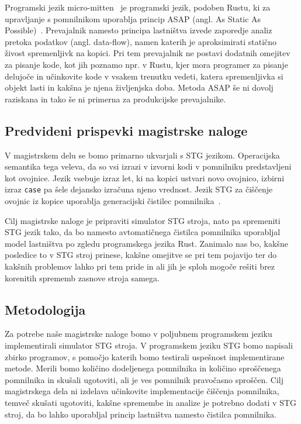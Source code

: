 \documentclass[a4paper, 12pt]{article}
\begin{document}

Programski jezik micro-mitten~\cite{corbyn:practical-static-memory-management,} je programski jezik, podoben Rustu, ki za upravljanje s pomnilnikom uporablja princip ASAP (angl. As Static As Possible)~\cite{proust2017asap}. Prevajalnik namesto principa lastništva izvede zaporedje analiz pretoka podatkov (angl. data-flow), namen katerih je aproksimirati statično živost spremenljivk na kopici. Pri tem prevajalnik ne postavi dodatnih omejitev za pisanje kode, kot jih poznamo npr. v Rustu, kjer mora programer za pisanje delujoče in učinkovite kode v vsakem trenutku vedeti, katera spremenljivka si objekt lasti in kakšna je njena življenjska doba. Metoda ASAP še ni dovolj raziskana in tako še ni primerna za produkcijske prevajalnike.

\subsection{Predvideni prispevki magistrske naloge}

V magistrskem delu se bomo primarno ukvarjali s STG jezikom. Operacijska semantika tega veleva, da so vsi izrazi v izvorni kodi v pomnilniku predstavljeni kot ovojnice. Jezik vsebuje izraz let, ki na kopici ustvari novo ovojnico, izbirni izraz \texttt{case} pa šele dejansko izračuna njeno vrednost. Jezik STG za čiščenje ovojnic iz kopice uporablja generacijski čistilec pomnilnika~\cite{jones1992implementing, marlow2004making}. 

Cilj magistrske naloge je pripraviti simulator STG stroja, nato pa spremeniti STG jezik tako, da bo namesto avtomatičnega čistilca pomnilnika uporabljal model lastništva po zgledu programskega jezika Rust. Zanimalo nas bo, kakšne posledice to v STG stroj prinese, kakšne omejitve se pri tem pojavijo ter do kakšnih problemov lahko pri tem pride in ali jih je sploh mogoče rešiti brez korenitih sprememb zasnove stroja samega.

\subsection{Metodologija}


Za potrebe naše magistrske naloge bomo v poljubnem programskem jeziku implementirali simulator STG stroja. V programskem jeziku STG bomo napisali zbirko programov, s pomočjo katerih bomo testirali uspešnost implementirane metode. Merili bomo količino dodeljenega pomnilnika in količino sproščenega pomnilnika in skušali ugotoviti, ali je ves pomnilnik pravočasno sproščen. Cilj magistrskega dela ni izdelava učinkovite implementacije čiščenja pomnilnika, temveč skušati ugotoviti, kakšne spremembe in analize je potrebno dodati v STG stroj, da bo lahko uporabljal princip lastništva namesto čistilca pomnilnika.   
\end{document}
